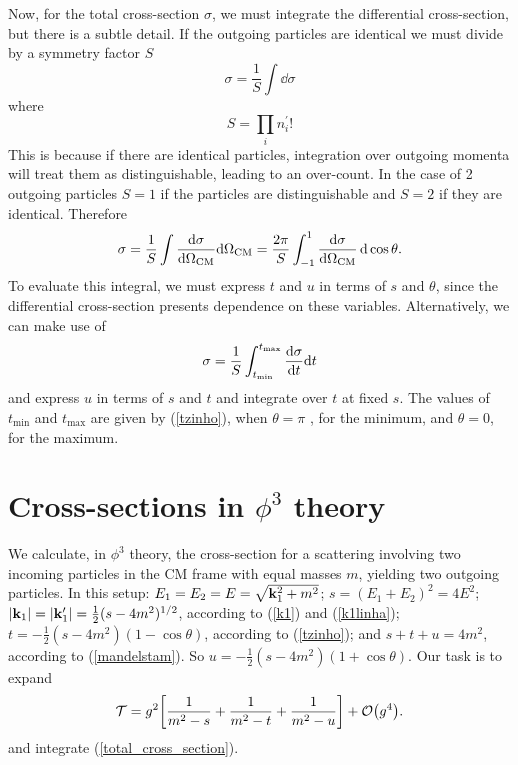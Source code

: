 Now, for the total cross-section $\sigma$, we must integrate the differential cross-section, but there is a subtle detail. If the outgoing particles are identical we must divide by a symmetry factor $S$
\begin{equation}
    \sigma=\frac{1}{S}\int\dd\sigma
\end{equation}
where 
\begin{equation}
    S=\prod_i n_i^\prime!
\end{equation}
This is because if there are identical particles, integration over outgoing momenta will treat them as distinguishable, leading to an over-count. In the case of 2 outgoing particles $S=1$ if the particles are distinguishable and $S=2$ if they are identical. Therefore
\begin{equation}
    \sigma=\frac{1}{S}\int\dv{\sigma}{\Omega_{\text{CM}}}\dd \Omega_{\text{CM}}=\frac{2\pi}{S}\int_{-1}^1\dv{\sigma}{\Omega_{\text{CM}}}\,\dd \cos \theta.
\end{equation}
To evaluate this integral, we must express $t$ and $u$ in terms of $s$ and $\theta$, since the differential cross-section presents dependence on these variables. Alternatively, we can make use of
\begin{equation}
    \sigma=\frac{1}{S}\int_{t_{\text{min}}}^{t_{\text{max}}}\dv{\sigma}{t}\dd t
    \label{total_cross_section}
\end{equation}
and express $u$ in terms of  $s$ and $t$ and integrate over $t$ at fixed $s$. The values of $t_{\text{min}}$ and $t_{\text{max}}$ are given by (\ref{tzinho}), when $\theta=\pi$ , for the minimum, and $\theta=0$, for the maximum.

\section{Cross-sections in $\phi^3$ theory}
We calculate, in $\phi^3$ theory, the cross-section for a scattering involving two incoming particles in the CM frame with equal masses $m$, yielding two outgoing particles. In this setup: $E_1=E_2=E=\sqrt{\vb{k}_1^2+m^2}$; $s=(E_1+E_2)^2=4E^2$; $\abs{\vb{k}_1}=\abs{\vb{k}_1^\prime}=\frac{1}{2}(s-4m^2)^{1/2}$, according to (\ref{k1}) and (\ref{k1linha}); $t=-\frac{1}{2}(s-4m^2)(1-\cos\theta)$, according to (\ref{tzinho}); and $s+t+u=4m^2$, according to (\ref{mandelstam}). So $u=-\frac{1}{2}(s-4m^2)(1+\cos\theta)$. Our task is to expand 
\begin{equation}
    \mathcal{T}=g^2\qty[\frac{1}{m^2-s}+\frac{1}{m^2-t}+\frac{1}{m^2-u}]+\order{g^4}.
\end{equation}
and integrate (\ref{total_cross_section}).\\

